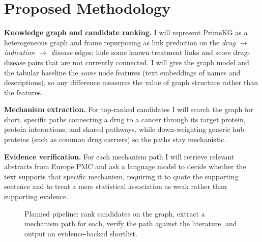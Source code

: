\documentclass[11pt]{article}
\begin{document}
\section{Proposed Methodology}

\textbf{Knowledge graph and candidate ranking.} I will represent PrimeKG as a
heterogeneous graph and frame repurposing as link prediction on the
\emph{drug $\rightarrow$ indication $\rightarrow$ disease} edges: hide some known
treatment links and score drug-disease pairs that are not currently connected. I
will give the graph model and the tabular baseline the \emph{same} node features
(text embeddings of names and descriptions), so any difference measures the value
of graph structure rather than the features.

\textbf{Mechanism extraction.} For top-ranked candidates I will search the graph
for short, specific paths connecting a drug to a cancer through its target protein,
protein interactions, and shared pathways, while down-weighting generic hub
proteins (such as common drug carriers) so the paths stay mechanistic.

\textbf{Evidence verification.} For each mechanism path I will retrieve relevant
abstracts from Europe PMC and ask a language model to decide whether the text
supports that specific mechanism, requiring it to quote the supporting sentence and
to treat a mere statistical association as weak rather than supporting evidence.

\begin{figure}[H]
\centering
{}
\caption{Planned pipeline: rank candidates on the graph, extract a mechanism path
for each, verify the path against the literature, and output an evidence-backed
shortlist.}
\label{fig:pipeline}
\end{figure}
\end{document}
